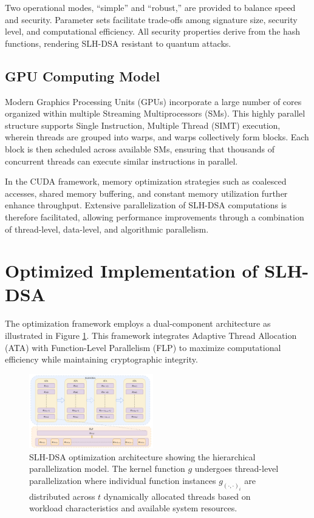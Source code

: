 \documentclass[journal]{IEEEtran}
\begin{document}
Two operational modes, “simple” and “robust,” are provided to balance speed and security. Parameter sets facilitate trade-offs among signature size, security level, and computational efficiency. All security properties derive from the hash functions, rendering SLH-DSA resistant to quantum attacks.

\subsection{GPU Computing Model}

Modern Graphics Processing Units (GPUs) incorporate a large number of cores organized within multiple Streaming Multiprocessors (SMs). This highly parallel structure supports Single Instruction, Multiple Thread (SIMT) execution, wherein threads are grouped into warps, and warps collectively form blocks. Each block is then scheduled across available SMs, ensuring that thousands of concurrent threads can execute similar instructions in parallel.

In the CUDA framework, memory optimization strategies such as coalesced accesses, shared memory buffering, and constant memory utilization further enhance throughput. Extensive parallelization of SLH-DSA computations is therefore facilitated, allowing performance improvements through a combination of thread-level, data-level, and algorithmic parallelism.

\section{Optimized Implementation of SLH-DSA}\label{sec:implementation}



The optimization framework employs a dual-component architecture as illustrated in Figure \ref{fig:optimization_architecture}. This framework integrates Adaptive Thread Allocation (ATA) with Function-Level Parallelism (FLP) to maximize computational efficiency while maintaining cryptographic integrity.

\begin{figure}[htbp]
  \centering
  \includegraphics[width=0.48\textwidth]{./fig/optimize-overview.drawio.pdf}
  \caption{SLH-DSA optimization architecture showing the hierarchical parallelization model. The kernel function $g$ undergoes thread-level parallelization where individual function instances $g_{(\cdot,\cdot)_i}$ are distributed across $t$ dynamically allocated threads based on workload characteristics and available system resources.}
  \label{fig:optimization_architecture}
\end{figure}
\end{document}
